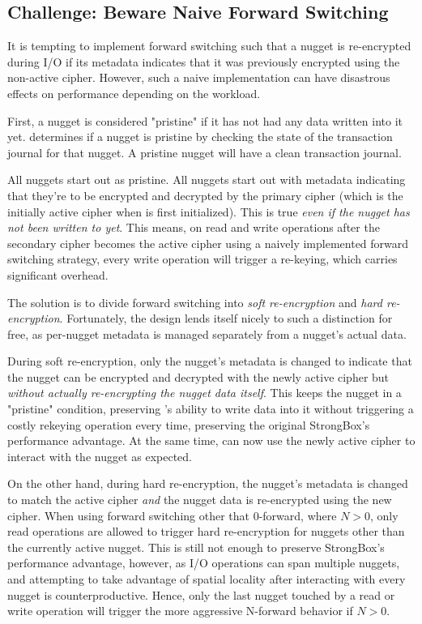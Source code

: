 \subsection{Challenge: Beware Naive Forward Switching}

It is tempting to implement forward switching such that a nugget is re-encrypted
during I/O if its metadata indicates that it was previously encrypted using the
non-active cipher. However, such a naive implementation can have disastrous
effects on performance depending on the workload.

First, a nugget is considered "pristine" if it has not had any data written into
it yet. \SYSTEM{} determines if a nugget is pristine by checking the state of
the transaction journal for that nugget. A pristine nugget will have a clean
transaction journal.

All nuggets start out as pristine. All nuggets start out with metadata
indicating that they're to be encrypted and decrypted by the primary cipher
(which is the initially active cipher when \SYSTEM{} is first initialized). This
is true \emph{even if the nugget has not been written to yet}. This means, on
read and write operations after the secondary cipher becomes the active cipher
using a naively implemented forward switching strategy, every write operation
will trigger a re-keying, which carries significant overhead.

The solution is to divide forward switching into \emph{soft re-encryption} and
\emph{hard re-encryption}. Fortunately, the \SYSTEM{} design lends itself nicely
to such a distinction for free, as per-nugget metadata is managed separately
from a nugget's actual data.

During soft re-encryption, only the nugget's metadata is changed to indicate
that the nugget can be encrypted and decrypted with the newly active cipher but
\emph{without actually re-encrypting the nugget data itself}. This keeps the
nugget in a "pristine" condition, preserving \SYSTEM{}'s ability to write data
into it without triggering a costly rekeying operation every time, preserving
the original StrongBox's performance advantage. At the same time, \SYSTEM{} can
now use the newly active cipher to interact with the nugget as expected.

On the other hand, during hard re-encryption, the nugget's metadata is changed
to match the active cipher \emph{and} the nugget data is re-encrypted using the
new cipher. When using forward switching other that 0-forward, 
where $N > 0$, only read operations are allowed to trigger hard re-encryption
for nuggets other than the currently active nugget. This is still not enough to
preserve StrongBox's performance advantage, however, as I/O operations can span
multiple nuggets, and attempting to take advantage of spatial locality after
interacting with every nugget is counterproductive. Hence, only the last nugget
touched by a read or write operation will trigger the more aggressive N-forward
behavior if $N > 0$.


